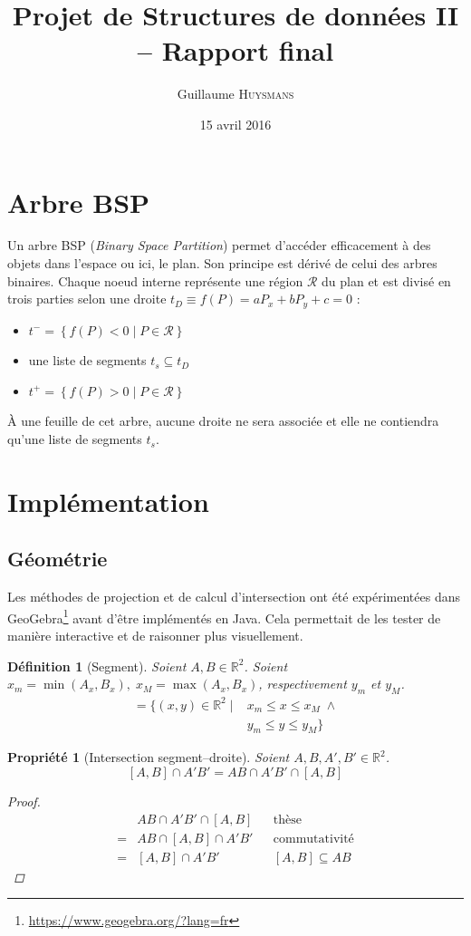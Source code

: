 \documentclass[12pt,twocolumn]{article}
\title{Projet de Structures de données II -- Rapport final}
\author{Guillaume \textsc{Huysmans}}
\date{15 avril 2016}
\newtheorem{prop}{Propriété}
\newtheorem{dfn}{Définition}
\newcommand{\esR}{\mathbb{R}}
\newcommand{\reg}{\mathcal{R}}
\newcommand{\inc}{\subseteq}
\begin{document}
\maketitle


\section{Arbre BSP}
Un arbre BSP (\textit{Binary Space Partition}) permet d'accéder efficacement
à des objets dans l'espace ou ici, le plan. Son principe est dérivé de celui
des arbres binaires. Chaque noeud interne représente une région $\reg$
du plan et est divisé en trois parties selon
une droite $t_D\equiv f(P)=aP_x+bP_y+c=0$ :
\begin{itemize}
	\item $t^-=\left\{f(P)<0 \; | \; P\in\reg\right\}$
	\item une liste de segments $t_s \inc t_D$
	\item $t^+=\left\{f(P)>0 \; | \; P\in\reg\right\}$
\end{itemize}

À une feuille de cet arbre, aucune droite ne sera associée et elle ne
contiendra qu'une liste de segments $t_s$.


\section{Implémentation}
\subsection{Géométrie}
Les méthodes de projection et de calcul d'intersection ont été expérimentées dans
GeoGebra\footnote{\url{https://www.geogebra.org/?lang=fr}}
avant d'être implémentés en Java. Cela permettait de les tester de manière
interactive et de raisonner plus visuellement.

\begin{dfn}[Segment]\label{dfn:seg}
Soient $A,B\in\esR^2$.
Soient $x_m=\min(A_x,B_x), \; x_M=\max(A_x,B_x)$,
respectivement $y_m$ et $y_M$.
\begin{align*}
	[A,B]=\{(x,y)\in\esR^2 \; | \;
	& x_m\leq x\leq x_M \; \land \\
	& y_m\leq y\leq y_M \}
\end{align*}
\end{dfn}

\begin{prop}[Intersection segment--droite]\label{prop:inter}
Soient $A,B,A',B'\in\esR^2$.
\[
	[A,B] \cap A'B' = AB \cap A'B' \cap [A,B]
\]
\begin{proof}
\begin{align*}
	& AB \cap A'B' \cap [A,B] && \text{thèse} \\
	= & AB \cap [A,B] \cap A'B' && \text{commutativité} \\
	= & [A,B] \cap A'B' && [A,B] \inc AB
\end{align*}
\end{proof}
\end{prop}
\end{document}
